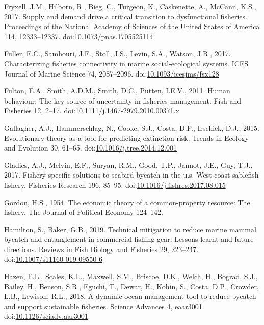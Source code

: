 \documentclass[]{elsarticle} %
\begin{document}
\leavevmode\hypertarget{ref-Fryxell2017}{}%
Fryxell, J.M., Hilborn, R., Bieg, C., Turgeon, K., Caskenette, A.,
McCann, K.S., 2017. Supply and demand drive a critical transition to
dysfunctional fisheries. Proceedings of the National Academy of Sciences
of the United States of America 114, 12333--12337.
doi:\href{https://doi.org/10.1073/pnas.1705525114}{10.1073/pnas.1705525114}

\leavevmode\hypertarget{ref-Fuller2017}{}%
Fuller, E.C., Samhouri, J.F., Stoll, J.S., Levin, S.A., Watson, J.R.,
2017. Characterizing fisheries connectivity in marine social-ecological
systems. ICES Journal of Marine Science 74, 2087--2096.
doi:\href{https://doi.org/10.1093/icesjms/fsx128}{10.1093/icesjms/fsx128}

\leavevmode\hypertarget{ref-Fulton2011h}{}%
Fulton, E.A., Smith, A.D.M., Smith, D.C., Putten, I.E.V., 2011. Human
behaviour: The key source of uncertainty in fisheries management. Fish
and Fisheries 12, 2--17.
doi:\href{https://doi.org/10.1111/j.1467-2979.2010.00371.x}{10.1111/j.1467-2979.2010.00371.x}

\leavevmode\hypertarget{ref-Gallagher2015}{}%
Gallagher, A.J., Hammerschlag, N., Cooke, S.J., Costa, D.P., Irschick,
D.J., 2015. Evolutionary theory as a tool for predicting extinction
risk. Trends in Ecology and Evolution 30, 61--65.
doi:\href{https://doi.org/10.1016/j.tree.2014.12.001}{10.1016/j.tree.2014.12.001}

\leavevmode\hypertarget{ref-Gladics2017}{}%
Gladics, A.J., Melvin, E.F., Suryan, R.M., Good, T.P., Jannot, J.E.,
Guy, T.J., 2017. Fishery-specific solutions to seabird bycatch in the
u.s. West coast sablefish fishery. Fisheries Research 196, 85--95.
doi:\href{https://doi.org/10.1016/j.fishres.2017.08.015}{10.1016/j.fishres.2017.08.015}

\leavevmode\hypertarget{ref-Gordon1954}{}%
Gordon, H.S., 1954. The economic theory of a common-property resource:
The fishery. The Journal of Political Economy 124--142.

\leavevmode\hypertarget{ref-Hamilton2019}{}%
Hamilton, S., Baker, G.B., 2019. Technical mitigation to reduce marine
mammal bycatch and entanglement in commercial fishing gear: Lessons
learnt and future directions. Reviews in Fish Biology and Fisheries 29,
223--247.
doi:\href{https://doi.org/10.1007/s11160-019-09550-6}{10.1007/s11160-019-09550-6}

\leavevmode\hypertarget{ref-Kohin2018}{}%
Hazen, E.L., Scales, K.L., Maxwell, S.M., Briscoe, D.K., Welch, H.,
Bograd, S.J., Bailey, H., Benson, S.R., Eguchi, T., Dewar, H., Kohin,
S., Costa, D.P., Crowder, L.B., Lewison, R.L., 2018. A dynamic ocean
management tool to reduce bycatch and support sustainable fisheries.
Science Advances 4, eaar3001.
doi:\href{https://doi.org/10.1126/sciadv.aar3001}{10.1126/sciadv.aar3001}
\end{document}
